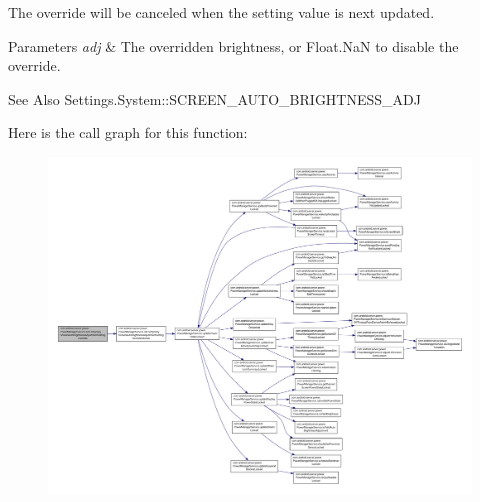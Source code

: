 The override will be canceled when the setting value is next updated.


\begin{DoxyParams}{Parameters}
{\em adj} & The overridden brightness, or Float.\-Na\-N to disable the override.\\
\hline
\end{DoxyParams}
\begin{DoxySeeAlso}{See Also}
Settings.\-System\-::\-S\-C\-R\-E\-E\-N\-\_\-\-A\-U\-T\-O\-\_\-\-B\-R\-I\-G\-H\-T\-N\-E\-S\-S\-\_\-\-A\-D\-J 
\end{DoxySeeAlso}


Here is the call graph for this function\-:
\nopagebreak
\begin{figure}[H]
\begin{center}
\leavevmode
\includegraphics[width=350pt]{classcom_1_1android_1_1server_1_1power_1_1PowerManagerService_ac6f361dfa708a4a0a96085f5117ef57a_cgraph}
\end{center}
\end{figure}


